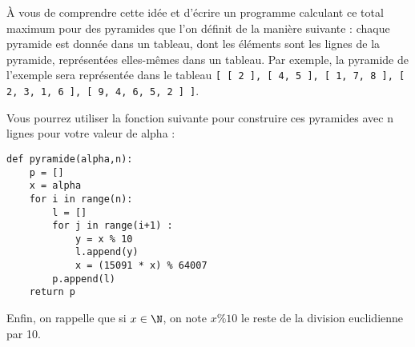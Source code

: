 À vous de comprendre cette idée et d'écrire un programme calculant ce total maximum pour 
des pyramides que l'on définit de la manière suivante : chaque pyramide est donnée dans 
un tableau, dont les éléments sont les lignes de la pyramide, représentées elles-mêmes 
dans un tableau. Par exemple, la pyramide de l'exemple sera représentée dans le tableau 
\texttt{[ [ 2 ], [ 4, 5 ], [ 1, 7, 8 ], [ 2, 3, 1, 6 ], [ 9, 4, 6, 5, 2 ] ]}. 

Vous pourrez utiliser la fonction suivante pour construire ces pyramides avec n lignes pour votre valeur de alpha  :
\begin{lstlisting}
def pyramide(alpha,n):
    p = []
    x = alpha
    for i in range(n):
        l = []
        for j in range(i+1) :
            y = x % 10
            l.append(y)
            x = (15091 * x) % 64007
        p.append(l)
    return p
\end{lstlisting}

Enfin, on rappelle que si $x\in\N$, on note $x\% 10$ le reste de la division euclidienne par 10.


\medskip




